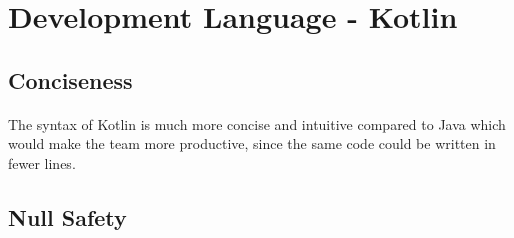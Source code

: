 \documentclass[paper=a4, fontsize=11pt]{scrartcl} %
\begin{document}



\section{Development Language - Kotlin}
\subsection{Conciseness}
\paragraph{} The syntax of Kotlin is much more concise and intuitive compared to Java which would make the team more productive, since the same code could be written in fewer lines.
\subsection{Null Safety}
\end{document}
